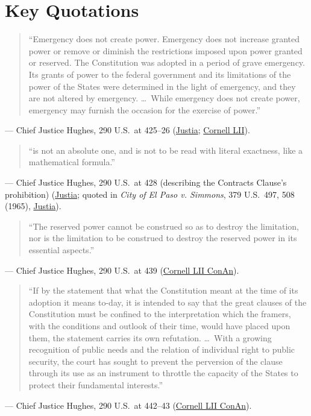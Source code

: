 \documentclass[12pt]{article}
\begin{document}
\section{Key Quotations}
\begin{quote}
``Emergency does not create power. Emergency does not increase granted power or remove or diminish the restrictions imposed upon power granted or reserved. The Constitution was adopted in a period of grave emergency. Its grants of power to the federal government and its limitations of the power of the States were determined in the light of emergency, and they are not altered by emergency. \ldots\ While emergency does not create power, emergency may furnish the occasion for the exercise of power.''
\end{quote}
\noindent --- Chief Justice Hughes, 290 U.S.\ at 425--26 (\href{https://supreme.justia.com/cases/federal/us/290/398/}{Justia}; \href{https://www.law.cornell.edu/supremecourt/text/290/398}{Cornell LII}).

\begin{quote}
``is not an absolute one, and is not to be read with literal exactness, like a mathematical formula.''
\end{quote}
\noindent --- Chief Justice Hughes, 290 U.S.\ at 428 (describing the Contracts Clause's prohibition) (\href{https://supreme.justia.com/cases/federal/us/290/398/}{Justia}; quoted in \emph{City of El Paso v. Simmons}, 379 U.S.\ 497, 508 (1965), \href{https://supreme.justia.com/cases/federal/us/379/497/}{Justia}).

\begin{quote}
``The reserved power cannot be construed so as to destroy the limitation, nor is the limitation to be construed to destroy the reserved power in its essential aspects.''
\end{quote}
\noindent --- Chief Justice Hughes, 290 U.S.\ at 439 (\href{https://www.law.cornell.edu/constitution-conan/article-1/section-10/clause-1/blaisdell-case-and-state-modifications-to-private-contracts}{Cornell LII ConAn}).

\begin{quote}
``If by the statement that what the Constitution meant at the time of its adoption it means to-day, it is intended to say that the great clauses of the Constitution must be confined to the interpretation which the framers, with the conditions and outlook of their time, would have placed upon them, the statement carries its own refutation. \ldots\ With a growing recognition of public needs and the relation of individual right to public security, the court has sought to prevent the perversion of the clause through its use as an instrument to throttle the capacity of the States to protect their fundamental interests.''
\end{quote}
\noindent --- Chief Justice Hughes, 290 U.S.\ at 442--43 (\href{https://www.law.cornell.edu/constitution-conan/article-1/section-10/clause-1/blaisdell-case-and-state-modifications-to-private-contracts}{Cornell LII ConAn}).
\end{document}
